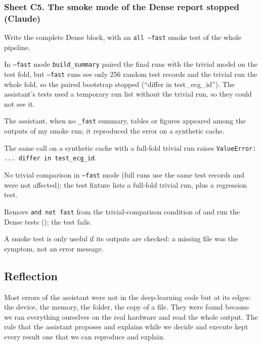 \subsubsection*{Sheet C5. The smoke mode of the Dense report stopped (Claude)}
\begin{description}[style=nextline,leftmargin=1.2em]
  \item[Prompt] Write the complete Dense block, with an \texttt{all --fast} smoke test of the whole
        pipeline.
  \item[Faulty response] In \texttt{--fast} mode \texttt{build\_summary} paired the final runs with the
        trivial model on the test fold, but \texttt{--fast} runs see only 256 random test records and the
        trivial run the whole fold, so the paired bootstrap stopped (``differ in test\_ecg\_id''). The
        assistant's tests used a temporary run list without the trivial run, so they could not see it.
  \item[Detected by] The assistant, when no \texttt{\_fast} summary, tables or figures appeared among the
        outputs of my smoke run; it reproduced the error on a synthetic cache.
  \item[Proof] The same call on a synthetic cache with a full-fold trivial run raises
        \texttt{ValueError: ... differ in test\_ecg\_id}.
  \item[Correction] No trivial comparison in \texttt{--fast} mode (full runs use the same test records and
        were not affected); the test fixture lists a full-fold trivial run, plus a regression test.
  \item[Reproduction] Remove \texttt{and not fast} from the trivial-comparison condition of
         and run the Dense tests
        (); the test
         fails.
  \item[Reflection] A smoke test is only useful if its outputs are checked: a missing file was the
        symptom, not an error message.
\end{description}

\subsection*{Reflection}

Most errors of the assistant were not in the deep-learning code but at its edges: the device, the memory,
the folder, the copy of a file. They were found because we ran everything ourselves on the real hardware
and read the whole output. The rule that the assistant proposes and explains while we decide and execute
kept every result one that we can reproduce and explain.
